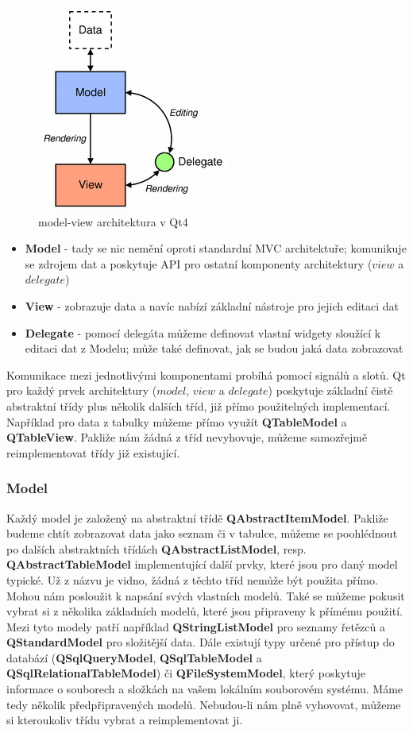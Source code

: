 \begin{figure}[h]
	\centering
	\includegraphics[scale=0.7]{pictures/qt/mv}
	\caption{model-view architektura v Qt4}
	\label{mvc}
\end{figure}

\begin{itemize}
	\item{\textbf{Model}} - tady se nic nemění oproti standardní MVC architektuře; komunikuje se zdrojem dat a poskytuje API pro ostatní komponenty architektury ($view$ a $delegate$)
	\item{\textbf{View}} - zobrazuje data a navíc nabízí základní nástroje pro jejich editaci dat
	\item{\textbf{Delegate}} - pomocí delegáta můžeme definovat vlastní widgety sloužící k editaci dat z Modelu; může také definovat, jak se budou jaká data zobrazovat
\end{itemize}

Komunikace mezi jednotlivými komponentami probíhá pomocí signálů a slotů. Qt pro každý prvek architektury ($model$, $view$ a $delegate$) poskytuje základní čistě abstraktní třídy plus několik dalších tříd, již přímo použitelných implementací. Například pro data z tabulky můžeme přímo využít \textbf{QTableModel} a \textbf{QTableView}. Pakliže nám žádná z tříd nevyhovuje, můžeme samozřejmě reimplementovat třídy již existující.

\subsubsection*{Model}
Každý model je založený na abstraktní třídě \textbf{QAbstractItemModel}. Pakliže budeme chtít zobrazovat data jako seznam či v tabulce, můžeme se poohlédnout po dalších abstraktních třídách \textbf{QAbstractListModel}, resp. \textbf{QAbstractTableModel} implementující další prvky, které jsou pro daný model typické. Už z názvu je vidno, žádná z těchto tříd nemůže být použita přímo. Mohou nám posloužit k napsání svých vlastních modelů. Také se můžeme pokusit vybrat si z několika základních modelů, které jsou připraveny k přímému použití. Mezi tyto modely patří například \textbf{QStringListModel} pro seznamy řetězců a \textbf{QStandardModel} pro složitější data. Dále existují typy určené pro přístup do databází (\textbf{QSqlQueryModel}, \textbf{QSqlTableModel} a \textbf{QSqlRelationalTableModel}) či \textbf{QFileSystemModel}, který poskytuje informace o souborech a složkách na vašem lokálním souborovém systému. Máme tedy několik předpřipravených modelů. Nebudou-li nám plně vyhovovat, můžeme si kteroukoliv třídu vybrat a reimplementovat ji.

